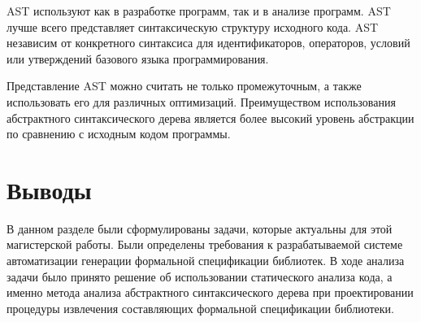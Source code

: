 AST используют как в разработке программ, так и в анализе программ.
AST лучше всего представляет синтаксическую структуру исходного кода. AST независим от конкретного синтаксиса для идентификаторов, операторов, условий или утверждений базового языка программирования.

Представление AST можно считать не только промежуточным, а также использовать его для различных оптимизаций. Преимуществом использования абстрактного синтаксического дерева является более высокий уровень абстракции по сравнению с исходным кодом программы.

\section{Выводы}

В данном разделе были сформулированы задачи, которые актуальны для этой магистерской работы. Были определены требования к разрабатываемой системе автоматизации генерации формальной спецификации библиотек.
В ходе анализа задачи было принято решение об использовании статического анализа кода, а именно метода анализа абстрактного синтаксического дерева при проектировании процедуры извлечения составляющих формальной спецификации библиотеки.